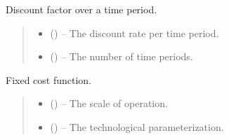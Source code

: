 \documentclass[letterpaper,10pt,english]{sphinxmanual}
\begin{document}

\begin{fulllineitems}
\label{\detokenize{technology:technology.pv_residential_large.discount}}
\pysigstartsignatures
{}
\pysigstopsignatures
\sphinxAtStartPar
Discount factor over a time period.
\begin{quote}\begin{description}
\begin{itemize}
\item {} 
\sphinxAtStartPar
{} () – The discount rate per time period.

\item {} 
\sphinxAtStartPar
{} () – The number of time periods.

\end{itemize}

\end{description}\end{quote}

\end{fulllineitems}


\begin{fulllineitems}
\label{\detokenize{technology:technology.pv_residential_large.fixed_cost}}
\pysigstartsignatures
{}
\pysigstopsignatures
\sphinxAtStartPar
Fixed cost function.
\begin{quote}\begin{description}
\begin{itemize}
\item {} 
\sphinxAtStartPar
{} () – The scale of operation.

\item {} 
\sphinxAtStartPar
{} () – The technological parameterization.

\end{itemize}

\end{description}\end{quote}

\end{fulllineitems}
\end{document}
